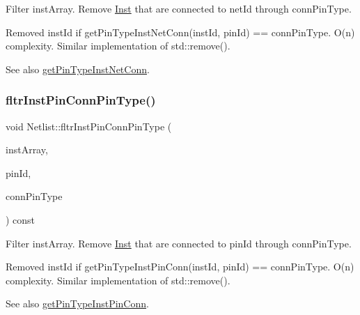 Filter inst\+Array. Remove \hyperlink{classInst}{Inst} that are connected to net\+Id through conn\+Pin\+Type. 

Removed inst\+Id if get\+Pin\+Type\+Inst\+Net\+Conn(inst\+Id, pin\+Id) == conn\+Pin\+Type. O(n) complexity. Similar implementation of std\+::remove().

\begin{DoxySeeAlso}{See also}
\hyperlink{classNetlist_a6bc6f9666ed8c833b967c38f2e164a1e}{get\+Pin\+Type\+Inst\+Net\+Conn}. 
\end{DoxySeeAlso}
\mbox{\label{classNetlist_a1df5b1bb963671f65331c287d4d56b2d}} 
\subsubsection{\texorpdfstring{fltr\+Inst\+Pin\+Conn\+Pin\+Type()}{fltrInstPinConnPinType()}}
{\footnotesize\ttfamily void Netlist\+::fltr\+Inst\+Pin\+Conn\+Pin\+Type (\begin{DoxyParamCaption}\item[{std\+::vector$<$ \hyperlink{type_8h_a581e8093e28e7362f2b6937296190676}{Index\+Type} $>$ \&}]{inst\+Array,  }\item[{\hyperlink{type_8h_a581e8093e28e7362f2b6937296190676}{Index\+Type}}]{pin\+Id,  }\item[{\hyperlink{type_8h_afaab50027002ecbb6c8ac27e727d1bb4}{Pin\+Type}}]{conn\+Pin\+Type }\end{DoxyParamCaption}) const}



Filter inst\+Array. Remove \hyperlink{classInst}{Inst} that are connected to pin\+Id through conn\+Pin\+Type. 

Removed inst\+Id if get\+Pin\+Type\+Inst\+Pin\+Conn(inst\+Id, pin\+Id) == conn\+Pin\+Type. O(n) complexity. Similar implementation of std\+::remove().

\begin{DoxySeeAlso}{See also}
\hyperlink{classNetlist_a27d477f7bd6fffd915015dbd3b3a0649}{get\+Pin\+Type\+Inst\+Pin\+Conn}. 
\end{DoxySeeAlso}
\mbox{\label{classNetlist_a384627c3bc5a55625a47465771361c08}} 

